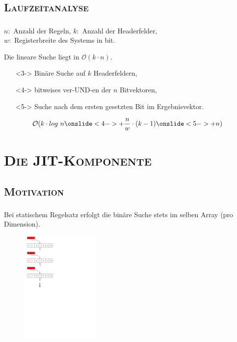 \documentclass[xcolor=x11names,compress]{beamer}
\renewcommand{\(}{\begin{columns}}
\renewcommand{\)}{\end{columns}}
\newcommand{\<}[1]{\begin{column}{#1}}
\renewcommand{\>}{\end{column}}
\begin{document}
\subsection{\scshape Laufzeitanalyse}
\begin{frame}
  \frametitle{\insertsubsection}
  $n:$ Anzahl der Regeln, $k:$ Anzahl der Headerfelder,\\$w:$ Registerbreite des Systems in bit.
  \pause
  \begin{tcolorbox}[colback=red!5!white,colframe=red!75!black,title=Erinnerung: Lineare Suche,drop fuzzy shadow]
  Die lineare Suche liegt in $\mathcal O(k \cdot n)$.
  \end{tcolorbox}
  \pause
  \begin{tcolorbox}[colback=yellow!5!white,colframe=yellow!75!black,title=Bitvector-Algorithmus,drop fuzzy shadow]
  \begin{itemize}[leftmargin=0cm]
    \item[]<3-> Binäre Suche auf $k$ Headerfeldern,
    \item[]<4-> bitweises ver-UND-en der $n$ Bitvektoren,
    \item[]<5-> Suche nach dem ersten gesetzten Bit im Ergebnisvektor.
  \end{itemize}
  \centering
  \begin{equation*}
  \mathcal O(k \cdot log\ n \onslide<4->{+ \frac{n}{w} \cdot (k - 1)} \onslide<5->{ + n})
  \end{equation*}
  \end{tcolorbox}%
\end{frame}

\section{\scshape Die JIT-Komponente}
\begin{frame}
  \centering\Huge{\insertsection}
\end{frame}

\subsection{\scshape Motivation}
\begin{frame}
  \frametitle{\insertsubsection}
  Bei statischem Regelsatz erfolgt die binäre Suche stets im selben Array (pro Dimension).\\
  \begin{figure}
  \centering
  \includegraphics[height=5.5cm]{figures/matching_process}
  \end{figure}
\end{frame}
\end{document}
